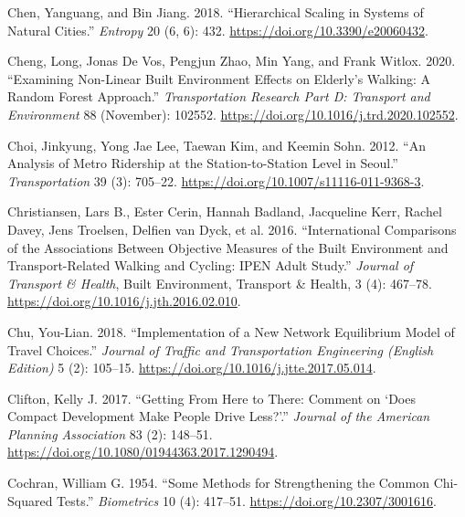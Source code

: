 \documentclass[
  11pt,
  openany]{memoir}
\newlength{\cslhangindent}
\newlength{\cslentryspacingunit} %
\newenvironment{CSLReferences}[2] %
 {%
  \setlength{\parindent}{0pt}
  \ifodd #1
  \let\oldpar\par
  \def\par{\hangindent=\cslhangindent\oldpar}
  \fi
  \setlength{\parskip}{#2\cslentryspacingunit}
 }%
 {}
\begin{document}
\begin{CSLReferences}{1}{0}
\leavevmode{}%
Chen, Yanguang, and Bin Jiang. 2018. {``Hierarchical {Scaling} in {Systems} of {Natural Cities}.''} \emph{Entropy} 20 (6, 6): 432. \url{https://doi.org/10.3390/e20060432}.

\leavevmode{}%
Cheng, Long, Jonas De Vos, Pengjun Zhao, Min Yang, and Frank Witlox. 2020. {``Examining Non-Linear Built Environment Effects on Elderly's Walking: A Random Forest Approach.''} \emph{Transportation Research Part D: Transport and Environment} 88 (November): 102552. \url{https://doi.org/10.1016/j.trd.2020.102552}.

\leavevmode{}%
Choi, Jinkyung, Yong Jae Lee, Taewan Kim, and Keemin Sohn. 2012. {``An Analysis of {Metro} Ridership at the Station-to-Station Level in {Seoul}.''} \emph{Transportation} 39 (3): 705--22. \url{https://doi.org/10.1007/s11116-011-9368-3}.

\leavevmode{}%
Christiansen, Lars B., Ester Cerin, Hannah Badland, Jacqueline Kerr, Rachel Davey, Jens Troelsen, Delfien van Dyck, et al. 2016. {``International Comparisons of the Associations Between Objective Measures of the Built Environment and Transport-Related Walking and Cycling: {IPEN} Adult Study.''} \emph{Journal of Transport \& Health}, Built {Environment}, {Transport} \& {Health}, 3 (4): 467--78. \url{https://doi.org/10.1016/j.jth.2016.02.010}.

\leavevmode{}%
Chu, You-Lian. 2018. {``Implementation of a New Network Equilibrium Model of Travel Choices.''} \emph{Journal of Traffic and Transportation Engineering (English Edition)} 5 (2): 105--15. \url{https://doi.org/10.1016/j.jtte.2017.05.014}.

\leavevmode{}%
Clifton, Kelly J. 2017. {``Getting {From Here} to {There}: Comment on {`{Does Compact Development Make People Drive Less}?'}.''} \emph{Journal of the American Planning Association} 83 (2): 148--51. \url{https://doi.org/10.1080/01944363.2017.1290494}.

\leavevmode{}%
Cochran, William G. 1954. {``Some {Methods} for {Strengthening} the {Common Chi}-{Squared Tests}.''} \emph{Biometrics} 10 (4): 417--51. \url{https://doi.org/10.2307/3001616}.


\end{CSLReferences}
\end{document}
